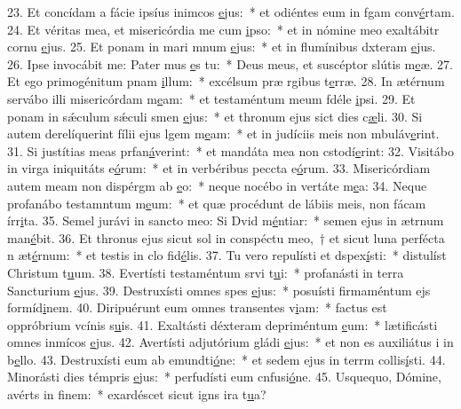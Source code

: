 23. Et concídam a fácie ipsíus inimcos \uline{e}jus:~* et odiéntes eum in fgam conv\uline{é}rtam.
24. Et véritas mea, et misericórdia me cum \uline{i}pso:~* et in nómine meo exaltábitr cornu \uline{e}jus.
25. Et ponam in mari mnum \uline{e}jus:~* et in flumínibus dxteram \uline{e}jus.
26. Ipse invocábit me: Pater mus \uline{e}s tu:~* Deus meus, et suscéptor slútis m\uline{e}æ.
27. Et ego primogénitum pnam \uline{i}llum:~* excélsum præ rgibus t\uline{e}rræ.
28. In ætérnum servábo illi misericórdam m\uline{e}am:~* et testaméntum meum fdéle \uline{i}psi.
29. Et ponam in sǽculum sǽculi smen \uline{e}jus:~* et thronum ejus sict dies c\uline{æ}li.
30. Si autem derelíquerint fílii ejus lgem m\uline{e}am:~* et in judíciis meis non mbuláv\uline{e}rint.
31. Si justítias meas prfan\uline{á}verint:~* et mandáta mea non cstodí\uline{e}rint:
32. Visitábo in virga iniquitáts e\uline{ó}rum:~* et in verbéribus peccta e\uline{ó}rum.
33. Misericórdiam autem meam non dispérgm ab \uline{e}o:~* neque nocébo in vertáte m\uline{e}a:
34. Neque profanábo testamntum m\uline{e}um:~* et quæ procédunt de lábiis meis, non fácam írr\uline{i}ta.
35. Semel jurávi in sancto meo: Si Dvid m\uline{é}ntiar:~* semen ejus in ætrnum man\uline{é}bit.
36. Et thronus ejus sicut sol in conspéctu meo,~† et sicut luna perfécta n æt\uline{é}rnum:~* et testis in clo fid\uline{é}lis.
37. Tu vero repulísti et dspex\uline{í}sti:~* distulíst Christum t\uline{u}um.
38. Evertísti testaméntum srvi t\uline{u}i:~* profanásti in terra Sancturium \uline{e}jus.
39. Destruxísti omnes spes \uline{e}jus:~* posuísti firmaméntum ejs formíd\uline{i}nem.
40. Diripuérunt eum omnes transentes v\uline{i}am:~* factus est oppróbrium vcínis s\uline{u}is.
41. Exaltásti déxteram depriméntum \uline{e}um:~* lætificásti omnes inmícos \uline{e}jus.
42. Avertísti adjutórium gládi \uline{e}jus:~* et non es auxiliátus i in b\uline{e}llo.
43. Destruxísti eum ab emundti\uline{ó}ne:~* et sedem ejus in terrm collis\uline{í}sti.
44. Minorásti dies témpris \uline{e}jus:~* perfudísti eum cnfusi\uline{ó}ne.
45. Usquequo, Dómine, avérts in f\uline{i}nem:~* exardéscet sicut igns ira t\uline{u}a?
